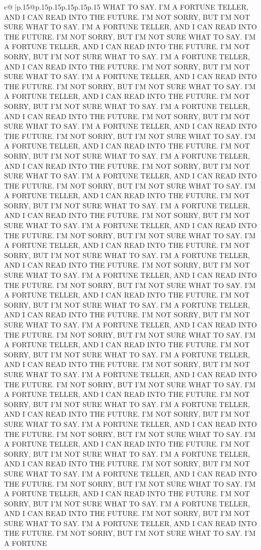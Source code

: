 \documentclass{article}
\begin{document}
{\begin{supertabular}{c@{$\;$}|p{.15\linewidth}@{}p{.15\linewidth}p{.15\linewidth}p{.15\linewidth}p{.15\linewidth}p{.15\linewidth}}
{{{WHAT TO SAY. I'M A FORTUNE TELLER, AND I CAN READ INTO THE FUTURE. I'M NOT SORRY, BUT I'M NOT SURE WHAT TO SAY. I'M A FORTUNE TELLER, AND I CAN READ INTO THE FUTURE. I'M NOT SORRY, BUT I'M NOT SURE WHAT TO SAY. I'M A FORTUNE TELLER, AND I CAN READ INTO THE FUTURE. I'M NOT SORRY, BUT I'M NOT SURE WHAT TO SAY. I'M A FORTUNE TELLER, AND I CAN READ INTO THE FUTURE. I'M NOT SORRY, BUT I'M NOT SURE WHAT TO SAY. I'M A FORTUNE TELLER, AND I CAN READ INTO THE FUTURE. I'M NOT SORRY, BUT I'M NOT SURE WHAT TO SAY. I'M A FORTUNE TELLER, AND I CAN READ INTO THE FUTURE. I'M NOT SORRY, BUT I'M NOT SURE WHAT TO SAY. I'M A FORTUNE TELLER, AND I CAN READ INTO THE FUTURE. I'M NOT SORRY, BUT I'M NOT SURE WHAT TO SAY. I'M A FORTUNE TELLER, AND I CAN READ INTO THE FUTURE. I'M NOT SORRY, BUT I'M NOT SURE WHAT TO SAY. I'M A FORTUNE TELLER, AND I CAN READ INTO THE FUTURE. I'M NOT SORRY, BUT I'M NOT SURE WHAT TO SAY. I'M A FORTUNE TELLER, AND I CAN READ INTO THE FUTURE. I'M NOT SORRY, BUT I'M NOT SURE WHAT TO SAY. I'M A FORTUNE TELLER, AND I CAN READ INTO THE FUTURE. I'M NOT SORRY, BUT I'M NOT SURE WHAT TO SAY. I'M A FORTUNE TELLER, AND I CAN READ INTO THE FUTURE. I'M NOT SORRY, BUT I'M NOT SURE WHAT TO SAY. I'M A FORTUNE TELLER, AND I CAN READ INTO THE FUTURE. I'M NOT SORRY, BUT I'M NOT SURE WHAT TO SAY. I'M A FORTUNE TELLER, AND I CAN READ INTO THE FUTURE. I'M NOT SORRY, BUT I'M NOT SURE WHAT TO SAY. I'M A FORTUNE TELLER, AND I CAN READ INTO THE FUTURE. I'M NOT SORRY, BUT I'M NOT SURE WHAT TO SAY. I'M A FORTUNE TELLER, AND I CAN READ INTO THE FUTURE. I'M NOT SORRY, BUT I'M NOT SURE WHAT TO SAY. I'M A FORTUNE TELLER, AND I CAN READ INTO THE FUTURE. I'M NOT SORRY, BUT I'M NOT SURE WHAT TO SAY. I'M A FORTUNE TELLER, AND I CAN READ INTO THE FUTURE. I'M NOT SORRY, BUT I'M NOT SURE WHAT TO SAY. I'M A FORTUNE TELLER, AND I CAN READ INTO THE FUTURE. I'M NOT SORRY, BUT I'M NOT SURE WHAT TO SAY. I'M A FORTUNE TELLER, AND I CAN READ INTO THE FUTURE. I'M NOT SORRY, BUT I'M NOT SURE WHAT TO SAY. I'M A FORTUNE TELLER, AND I CAN READ INTO THE FUTURE. I'M NOT SORRY, BUT I'M NOT SURE WHAT TO SAY. I'M A FORTUNE TELLER, AND I CAN READ INTO THE FUTURE. I'M NOT SORRY, BUT I'M NOT SURE WHAT TO SAY. I'M A FORTUNE TELLER, AND I CAN READ INTO THE FUTURE. I'M NOT SORRY, BUT I'M NOT SURE WHAT TO SAY. I'M A FORTUNE TELLER, AND I CAN READ INTO THE FUTURE. I'M NOT SORRY, BUT I'M NOT SURE WHAT TO SAY. I'M A FORTUNE TELLER, AND I CAN READ INTO THE FUTURE. I'M NOT SORRY, BUT I'M NOT SURE WHAT TO SAY. I'M A FORTUNE TELLER, AND I CAN READ INTO THE FUTURE. I'M NOT SORRY, BUT I'M NOT SURE WHAT TO SAY. I'M A FORTUNE TELLER, AND I CAN READ INTO THE FUTURE. I'M NOT SORRY, BUT I'M NOT SURE WHAT TO SAY. I'M A FORTUNE TELLER, AND I CAN READ INTO THE FUTURE. I'M NOT SORRY, BUT I'M NOT SURE WHAT TO SAY. I'M A FORTUNE TELLER, AND I CAN READ INTO THE FUTURE. I'M NOT SORRY, BUT I'M NOT SURE WHAT TO SAY. I'M A FORTUNE TELLER, AND I CAN READ INTO THE FUTURE. I'M NOT SORRY, BUT I'M NOT SURE WHAT TO SAY. I'M A FORTUNE TELLER, AND I CAN READ INTO THE FUTURE. I'M NOT SORRY, BUT I'M NOT SURE WHAT TO SAY. I'M A FORTUNE TELLER, AND I CAN READ INTO THE FUTURE. I'M NOT SORRY, BUT I'M NOT SURE WHAT TO SAY. I'M A FORTUNE }}}
\end{supertabular}}
\end{document}
